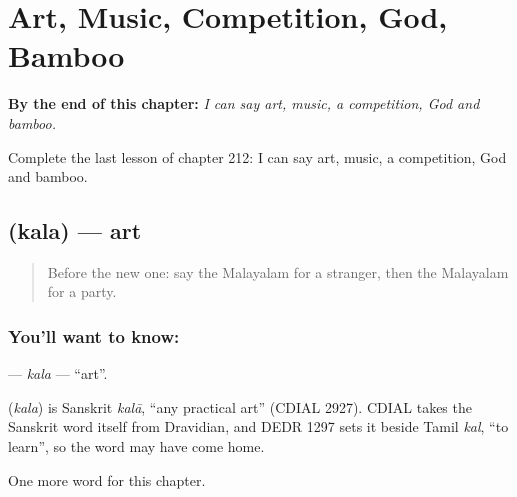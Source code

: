 
\chapter{Art, Music, Competition, God, Bamboo}
\label{ch:ml-art-music-competition-god-bamboo}

\begin{chapteropening}
\textbf{By the end of this chapter:} \emph{I can say art, music, a competition, God and bamboo.}

Complete the last lesson of chapter 212: I can say art, music, a competition, God and bamboo.
\end{chapteropening}

\section[\texorpdfstring{\ml{കല} (kala)}{കല (kala)}]{ (kala) — art}

\label{lesson:ML-C212-kala}



\begin{quote}
Before the new one: say the Malayalam for a stranger, then the Malayalam for a party.
\end{quote}

\subsection*{You'll want to know: }
\textbf{} — \emph{kala} — \textquotedblleft{}art\textquotedblright{}.

\begin{cousinweb}
\textbf{} (\emph{kala}) is Sanskrit \emph{kalā}, \textquotedblleft{}any practical art\textquotedblright{} (CDIAL 2927). CDIAL takes the Sanskrit word itself from Dravidian, and DEDR 1297 sets it beside Tamil \emph{kal}, \textquotedblleft{}to learn\textquotedblright{}, so the word may have come home.
\end{cousinweb}

\begin{grammarlens}[title={What you've built}]
One more word for this chapter.
\end{grammarlens}

